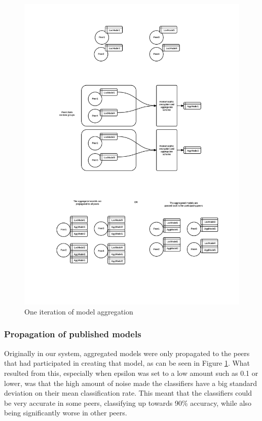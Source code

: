 \begin{figure}[h!]
  \centering
   \includegraphics[width=\textwidth]{fig/peerModelCreation2}
 \caption{One iteration of model aggregation}
\label{fig:peerAggregationFigure}
\end{figure}

\subsubsection{Propagation of published models} \label{sec:PropagationPubModel}

Originally in our system, aggregated models were only propagated to the peers that had participated in creating that model, as can be seen in Figure \ref{fig:peerAggregationFigure}. What resulted from this, especially when epsilon was set to a low amount such as 0.1 or lower, was that the high amount of noise made the classifiers have a big standard deviation on their mean classification rate. This meant  that the classifiers could be very accurate in some peers, classifying up towards 90\% accuracy, while also being significantly worse in other peers. 

